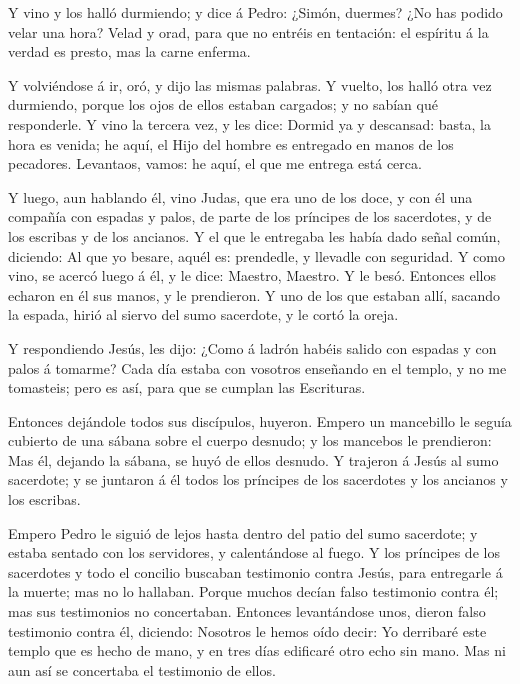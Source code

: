  Y vino y los halló durmiendo; y dice á Pedro: ¿Simón,
duermes? ¿No has podido velar una hora?  Velad y orad, para
que no entréis en tentación: el espíritu á la verdad es presto, mas la
carne enferma.

 Y volviéndose á ir, oró, y dijo las mismas palabras.
 Y vuelto, los halló otra vez durmiendo, porque los ojos de
ellos estaban cargados; y no sabían qué responderle.  Y
vino la tercera vez, y les dice: Dormid ya y descansad: basta, la hora
es venida; he aquí, el Hijo del hombre es entregado en manos de los
pecadores.  Levantaos, vamos: he aquí, el que me entrega
está cerca.

 Y luego, aun hablando él, vino Judas, que era uno de los
doce, y con él una compañía con espadas y palos, de parte de los
príncipes de los sacerdotes, y de los escribas y de los ancianos.
 Y el que le entregaba les había dado señal común,
diciendo: Al que yo besare, aquél es: prendedle, y llevadle con
seguridad.  Y como vino, se acercó luego á él, y le dice:
Maestro, Maestro. Y le besó.  Entonces ellos echaron en él
sus manos, y le prendieron.  Y uno de los que estaban allí,
sacando la espada, hirió al siervo del sumo sacerdote, y le cortó la
oreja.

 Y respondiendo Jesús, les dijo: ¿Como á ladrón habéis
salido con espadas y con palos á tomarme?  Cada día estaba
con vosotros enseñando en el templo, y no me tomasteis; pero es así,
para que se cumplan las Escrituras.

 Entonces dejándole todos sus discípulos, huyeron.
 Empero un mancebillo le seguía cubierto de una sábana
sobre el cuerpo desnudo; y los mancebos le prendieron:  Mas
él, dejando la sábana, se huyó de ellos desnudo.  Y
trajeron á Jesús al sumo sacerdote; y se juntaron á él todos los
príncipes de los sacerdotes y los ancianos y los escribas.

 Empero Pedro le siguió de lejos hasta dentro del patio del
sumo sacerdote; y estaba sentado con los servidores, y calentándose al
fuego.  Y los príncipes de los sacerdotes y todo el
concilio buscaban testimonio contra Jesús, para entregarle á la muerte;
mas no lo hallaban.  Porque muchos decían falso testimonio
contra él; mas sus testimonios no concertaban.  Entonces
levantándose unos, dieron falso testimonio contra él, diciendo:
 Nosotros le hemos oído decir: Yo derribaré este templo que
es hecho de mano, y en tres días edificaré otro echo sin mano.
 Mas ni aun así se concertaba el testimonio de ellos.


